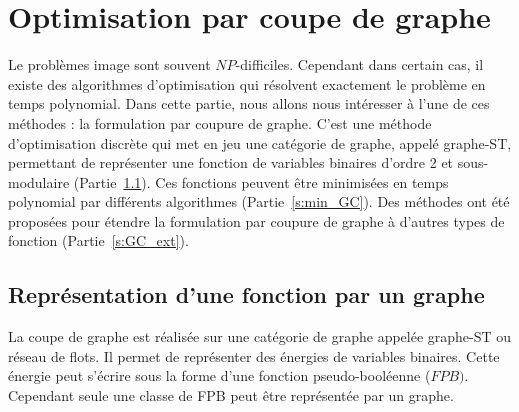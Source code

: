 \documentclass[../main/These_Mathias_Paget.tex]{subfiles}
\begin{document}

\chapter{Optimisation par coupe de graphe}

Le problèmes image sont souvent $NP$-difficiles. Cependant dans certain cas, il existe des algorithmes d'optimisation qui résolvent exactement le problème en temps polynomial. Dans cette partie, nous allons nous intéresser à l'une de ces méthodes : la formulation par coupure de graphe. C'est une méthode d'optimisation discrète qui met en jeu une catégorie de graphe, appelé graphe-ST, permettant de représenter une fonction de variables binaires d'ordre 2 et sous-modulaire (Partie~\ref{s:GC}). Ces fonctions peuvent être minimisées en temps polynomial par différents algorithmes (Partie~\ref{s:min_GC}). Des méthodes ont été proposées pour étendre la formulation par coupure de graphe à d'autres types de fonction (Partie~\ref{s:GC_ext}).

\section{Représentation d'une fonction par un graphe}
\label{s:GC}

La coupe de graphe est réalisée sur une catégorie de graphe appelée graphe-ST ou réseau de flots. Il permet de représenter des énergies de variables binaires. Cette énergie peut s’écrire sous la forme d'une fonction pseudo-booléenne ($FPB)$. Cependant seule une classe de FPB peut être représentée par un graphe.
\end{document}
